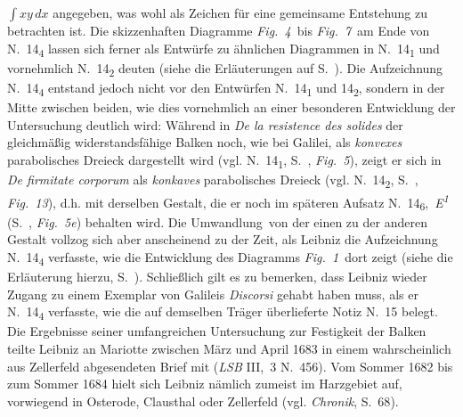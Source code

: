 $\displaystyle\!\!\int\!\!\!xy\,dx$ angegeben, was wohl als Zeichen für eine gemeinsame Entstehung zu betrachten ist.
Die skizzenhaften Diagramme \lbrack\textit{Fig.~4}\rbrack\ bis \lbrack\textit{Fig.~7}\rbrack\ am Ende von N.~14\textsubscript{4} lassen sich ferner als Entwürfe zu ähnlichen Diagrammen in N.~14\textsubscript{1} und vornehmlich N.~14\textsubscript{2} deuten (siehe die Erläuterungen auf S.~\pageref{LH_35_14_02_039r2_Fig.6}). %
Die Aufzeichnung N.~14\textsubscript{4} entstand jedoch nicht vor den Entwürfen N.~14\textsubscript{1} und 14\textsubscript{2}, sondern in der Mitte zwischen beiden, wie dies vornehmlich an einer besonderen Entwicklung der Untersuchung deutlich wird:
Während in \textit{De la resistence des solides} der gleichmäßig widerstandsfähige Balken noch, wie bei Galilei, als \textit{konvexes} parabolisches Dreieck dargestellt wird (vgl. N.~14\textsubscript{1}, S.~\pageref{LH_37_03_073v_Fig.5}, \lbrack\textit{Fig.~5}\rbrack), zeigt er sich in \textit{De firmitate corporum} als \textit{konkaves} parabolisches Dreieck (vgl. N.~14\textsubscript{2}, S.~\pageref{LH_35_09_16_001r_Fig.13}, \lbrack\textit{Fig.~13}\rbrack), d.h. mit derselben Gestalt, die er noch im späteren Aufsatz N.~14\textsubscript{6},~\textit{E\textsuperscript{1}} (S.~\pageref{LH_37_03_072v+AE_1684_323_Fig.5e}, \lbrack\textit{Fig.~5e}\rbrack) behalten wird.
Die \glqq Umwandlung\grqq\ von der einen zu der anderen Gestalt vollzog sich aber anscheinend zu der Zeit, als Leibniz die Aufzeichnung N.~14\textsubscript{4} verfasste, wie die Entwicklung des Diagramms \lbrack\textit{Fig.~1}\rbrack\ dort zeigt (siehe die Erläuterung hierzu, S.~\pageref{LH_35_14_02_039r2_Fig.1}).
Schließlich gilt es zu bemerken, dass Leibniz wieder Zugang zu einem Exemplar von Galileis \textit{Discorsi} gehabt haben muss, als er N.~14\textsubscript{4} verfasste, wie die auf demselben Träger überlieferte Notiz N.~15 belegt.%
\pend%
\pstart%
Die Ergebnisse seiner umfangreichen Untersuchung zur Festigkeit der Balken teilte Leibniz an Mariotte zwischen März und April 1683 in einem wahrscheinlich aus Zellerfeld\protect{} abgesendeten Brief mit (\textit{LSB} III,~3 N.~456\cite{01262}).
Vom Sommer 1682 bis zum Sommer 1684 hielt sich Leibniz nämlich zumeist im Harzgebiet\protect{} auf, vorwiegend in Osterode,\protect{} Clausthal\protect{} oder Zellerfeld\protect{} (vgl. \textit{Chronik}, S.~68\cite{01236}).
